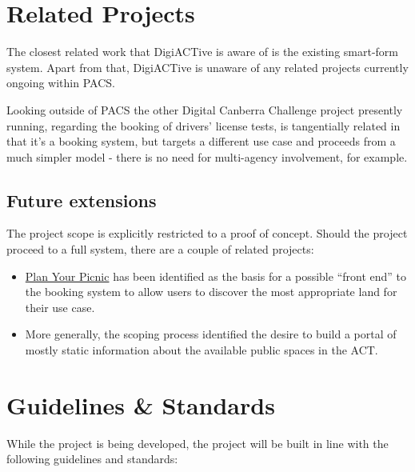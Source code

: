 \documentclass[12pt,a4paper,twosided]{article}
\begin{document}
\section{Related Projects}

The closest related work that DigiACTive is aware of is the existing
smart-form system. Apart from that, DigiACTive is unaware of any related
projects currently ongoing within PACS.

Looking outside of PACS the other Digital Canberra Challenge project
presently running, regarding the booking of drivers' license tests, is
tangentially related in that it's a booking system, but targets a
different use case and proceeds from a much simpler model - there is no
need for multi-agency involvement, for example.

\subsection{Future extensions}

The project scope is explicitly restricted to a proof of concept. Should
the project proceed to a full system, there are a couple of related
projects:

\begin{itemize}
\itemsep1pt\parskip0pt
\item
  \href{http://planyourpicnic.org.au}{Plan Your Picnic} has been
  identified as the basis for a possible ``front end'' to the booking
  system to allow users to discover the most appropriate land for their
  use case.
\item
  More generally, the scoping process identified the desire to build a
  portal of mostly static information about the available public spaces
  in the ACT.
\end{itemize}

\section{Guidelines \& Standards}

While the project is being developed, the project will be built in line
with the following guidelines and standards:
\end{document}
